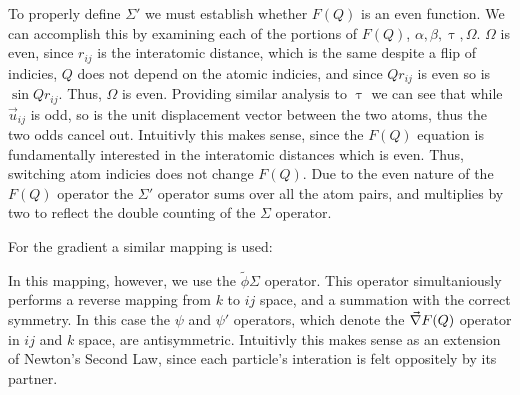 To properly define $\Sigma'$ we must establish whether $F(Q)$ is an even function.  
We can accomplish this by examining each of the portions of $F(Q)$, $\alpha, \beta ,\uptau, \Omega$.
$\Omega$ is even, since $r_{ij}$ is the interatomic distance, which is the same despite a flip of indicies, $Q$ does not depend on the atomic indicies, and since $Qr_{ij}$ is even so is $\sin{Qr_{ij}}$.  Thus, $\Omega$ is even.  Providing similar analysis to $\uptau$ we can see that while $\vec{u}_{ij}$ is odd, so is the unit displacement vector between the two atoms, thus the two odds cancel out.
Intuitivly this makes sense, since the $F(Q)$ equation is fundamentally interested in the interatomic distances which is even.  Thus, switching atom indicies does not change $F(Q)$.
Due to the even nature of the $F(Q)$ operator the $\Sigma'$ operator sums over all the atom pairs, and multiplies by two to reflect the double counting of the $\Sigma$ operator.

For the gradient a similar mapping is used:
\begin{figure}[h!]
\begin{center}
\end{center}
\end{figure}

In this mapping, however, we use the $\tilde{\phi}\Sigma$ operator.  This operator simultaniously performs a reverse mapping from $k$ to $ij$ space, and a summation with the correct symmetry.  In this case the $\psi$ and $\psi'$ operators, which denote the $\vec{\nabla} F(Q)$ operator in $ij$ and $k$ space, are antisymmetric.  Intuitivly this makes sense as an extension of Newton's Second Law, since each particle's interation is felt oppositely by its partner.
